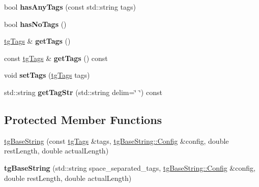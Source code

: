 \begin{DoxyCompactItemize}
\item 
\hypertarget{classtg_taggable_af14af28fa98021c4f20a5e8f2ddd5606}{bool {\bfseries has\-Any\-Tags} (const std\-::string tags)}\label{classtg_taggable_af14af28fa98021c4f20a5e8f2ddd5606}

\item 
\hypertarget{classtg_taggable_adff345e116e16420c701a748ff8f995f}{bool {\bfseries has\-No\-Tags} ()}\label{classtg_taggable_adff345e116e16420c701a748ff8f995f}

\item 
\hypertarget{classtg_taggable_acf1d7fa9df8f374f25015c4080902681}{\hyperlink{classtg_tags}{tg\-Tags} \& {\bfseries get\-Tags} ()}\label{classtg_taggable_acf1d7fa9df8f374f25015c4080902681}

\item 
\hypertarget{classtg_taggable_ae70d7d3b45301665bc363b0ed8b9b292}{const \hyperlink{classtg_tags}{tg\-Tags} \& {\bfseries get\-Tags} () const }\label{classtg_taggable_ae70d7d3b45301665bc363b0ed8b9b292}

\item 
\hypertarget{classtg_taggable_a5492888e4e4da4cca6261070b5726adf}{void {\bfseries set\-Tags} (\hyperlink{classtg_tags}{tg\-Tags} tags)}\label{classtg_taggable_a5492888e4e4da4cca6261070b5726adf}

\item 
\hypertarget{classtg_taggable_a346d66b066d2d9eb1eadba01da43749f}{std\-::string {\bfseries get\-Tag\-Str} (std\-::string delim=\char`\"{} \char`\"{}) const }\label{classtg_taggable_a346d66b066d2d9eb1eadba01da43749f}

\end{DoxyCompactItemize}
\subsection*{Protected Member Functions}
\begin{DoxyCompactItemize}
\item 
\hyperlink{classtg_base_string_acb8cc5ce9f02efdcdcb9bc8929f9fdb0}{tg\-Base\-String} (const \hyperlink{classtg_tags}{tg\-Tags} \&tags, \hyperlink{structtg_base_string_1_1_config}{tg\-Base\-String\-::\-Config} \&config, double rest\-Length, double actual\-Length)
\item 
\hypertarget{classtg_base_string_a9d62b01fda5212f17f6643fc2e1ecc14}{{\bfseries tg\-Base\-String} (std\-::string space\-\_\-separated\-\_\-tags, \hyperlink{structtg_base_string_1_1_config}{tg\-Base\-String\-::\-Config} \&config, double rest\-Length, double actual\-Length)}\label{classtg_base_string_a9d62b01fda5212f17f6643fc2e1ecc14}

\end{DoxyCompactItemize}
